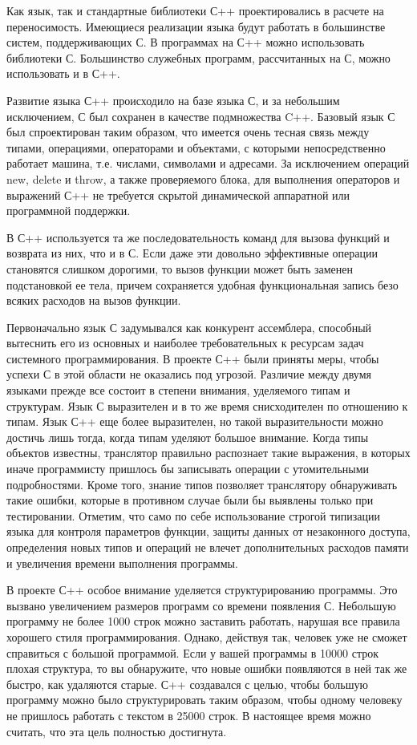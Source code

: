 Как язык, так и стандартные библиотеки С++ проектировались в расчете на переносимость. Имеющиеся реализации языка будут работать в большинстве систем, поддерживающих С. В программах на С++ можно использовать библиотеки С. Большинство служебных программ, рассчитанных на С, можно использовать и в С++.

Развитие языка С++ происходило на базе языка С, и за небольшим исключением, С был сохранен в качестве подмножества C++. Базовый язык С был спроектирован таким образом, что имеется очень тесная связь между типами, операциями, операторами и объектами, с которыми непосредственно работает машина, т.е. числами, символами и адресами. За исключением операций new, delete и throw, а также проверяемого блока, для выполнения операторов и выражений С++ не требуется скрытой динамической аппаратной или программной поддержки.

В С++ используется та же последовательность команд для вызова функций и возврата из них, что и в С. Если даже эти довольно эффективные операции становятся слишком дорогими, то вызов функции может быть заменен подстановкой ее тела, причем сохраняется удобная функциональная запись безо всяких расходов на вызов функции.

Первоначально язык С задумывался как конкурент ассемблера, способный вытеснить его из основных и наиболее требовательных к ресурсам задач системного программирования. В проекте С++ были приняты меры, чтобы успехи С в этой области не оказались под угрозой. Различие между двумя языками прежде все состоит в степени внимания, уделяемого типам и структурам. Язык С выразителен и в то же время снисходителен по отношению к типам. Язык С++ еще более выразителен, но такой выразительности можно достичь лишь тогда, когда типам уделяют большое внимание. Когда типы объектов известны, транслятор правильно распознает такие выражения, в которых иначе программисту пришлось бы записывать операции с утомительными подробностями. Кроме того, знание типов позволяет транслятору обнаруживать такие ошибки, которые в противном случае были бы выявлены только при тестировании. Отметим, что само по себе использование строгой типизации языка для контроля параметров функции, защиты данных от незаконного доступа, определения новых типов и операций не влечет дополнительных расходов памяти и увеличения времени выполнения программы.

В проекте С++ особое внимание уделяется структурированию программы. Это вызвано увеличением размеров программ со времени появления С. Небольшую программу не более 1000 строк можно заставить работать, нарушая все правила хорошего стиля программирования. Однако, действуя так, человек уже не сможет справиться с большой программой. Если у вашей программы в 10000 строк плохая структура, то вы обнаружите, что новые ошибки появляются в ней так же быстро, как удаляются старые. С++ создавался с целью, чтобы большую программу можно было структурировать таким образом, чтобы одному человеку не пришлось работать с текстом в 25000 строк. В настоящее время можно считать, что эта цель полностью достигнута.

